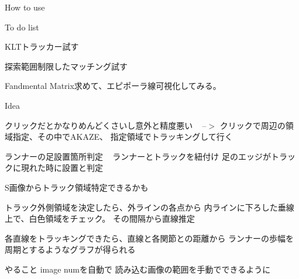 
\begin{DoxyEnumerate}
\item How to use
\end{DoxyEnumerate}
\begin{DoxyEnumerate}
\item To do list
\begin{DoxyEnumerate}
\item K\+L\+Tトラッカー試す
\end{DoxyEnumerate}
\begin{DoxyEnumerate}
\item 探索範囲制限したマッチング試す
\end{DoxyEnumerate}
\begin{DoxyEnumerate}
\item Fandmental Matrix求めて、エピポーラ線可視化してみる。
\end{DoxyEnumerate}
\end{DoxyEnumerate}
\begin{DoxyEnumerate}
\item Idea
\begin{DoxyEnumerate}
\item クリックだとかなりめんどくさいし意外と精度悪い ~\newline
 --$>$ クリックで周辺の領域指定、その中で\+A\+K\+A\+Z\+E、 指定領域でトラッキングして行く
\end{DoxyEnumerate}
\begin{DoxyEnumerate}
\item ランナーの足設置箇所判定 ~\newline
 ランナーとトラックを紐付け 足のエッジがトラックに現れた時に設置と判定
\end{DoxyEnumerate}
\begin{DoxyEnumerate}
\item S画像からトラック領域特定できるかも
\end{DoxyEnumerate}
\begin{DoxyEnumerate}
\item トラック外側領域を決定したら、外ラインの各点から 内ラインに下ろした垂線上で、白色領域をチェック。 その間隔から直線推定
\end{DoxyEnumerate}
\begin{DoxyEnumerate}
\item 各直線をトラッキングできたら、直線と各関節との距離から ランナーの歩幅を周期とするようなグラフが得られる
\end{DoxyEnumerate}

やること image numを自動で 読み込む画像の範囲を手動でできるように 
\end{DoxyEnumerate}